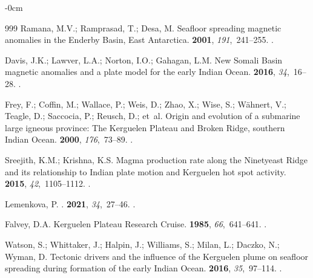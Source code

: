 \documentclass[geomatics,article,accept,pdftex,moreauthors]{Definitions/mdpi}
\begin{document}
\begin{adjustwidth}{-\extralength}{0cm}
\begin{thebibliography}{999}
Ramana, M.V.; Ramprasad, T.; Desa, M.
\newblock Seafloor spreading magnetic anomalies in the Enderby Basin, East
  Antarctica.
 {\bf 2001}, {\em
  191},~241--255.
.

Davis, J.K.; Lawver, L.A.; Norton, I.O.; Gahagan, L.M.
\newblock New Somali Basin magnetic anomalies and a plate model for the early
  Indian Ocean.
 {\bf 2016}, {\em 34},~16--28.
.

Frey, F.; Coffin, M.; Wallace, P.; Weis, D.; Zhao, X.; Wise, S.; Wähnert, V.;
  Teagle, D.; Saccocia, P.; Reusch, D.;  et~al.
\newblock Origin and evolution of a submarine large igneous province: The
  Kerguelen Plateau and Broken Ridge, southern Indian Ocean.
 {\bf 2000}, {\em
  176},~73--89.
.

Sreejith, K.M.; Krishna, K.S.
\newblock Magma production rate along the Ninetyeast Ridge and its relationship
  to Indian plate motion and Kerguelen hot spot activity.
 {\bf 2015}, {\em 42},~1105--1112.
.

Lemenkova, P.
.
 {\bf 2021}, {\em 34},~27--46.
.

Falvey, D.A.
\newblock Kerguelen Plateau Research Cruise.
 {\bf 1985}, {\em
  66},~641--641.
.

Watson, S.; Whittaker, J.; Halpin, J.; Williams, S.; Milan, L.; Daczko, N.;
  Wyman, D.
\newblock Tectonic drivers and the influence of the Kerguelen plume on seafloor
  spreading during formation of the early Indian Ocean.
 {\bf 2016}, {\em 35},~97--114.
.


\end{thebibliography}
\end{adjustwidth}
\end{document}
